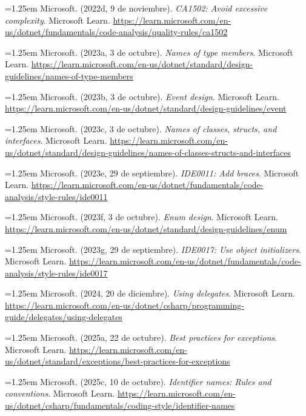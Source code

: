 \smallskip
\noindent\hangindent=1.25em Microsoft. (2022d, 9 de noviembre). \textit{CA1502: Avoid excessive complexity}. Microsoft Learn. \url{https://learn.microsoft.com/en-us/dotnet/fundamentals/code-analysis/quality-rules/ca1502}

\smallskip
\noindent\hangindent=1.25em Microsoft. (2023a, 3 de octubre). \textit{Names of type members}. Microsoft Learn. \url{https://learn.microsoft.com/en-us/dotnet/standard/design-guidelines/names-of-type-members}

\smallskip
\noindent\hangindent=1.25em Microsoft. (2023b, 3 de octubre). \textit{Event design}. Microsoft Learn. \url{https://learn.microsoft.com/en-us/dotnet/standard/design-guidelines/event}

\smallskip
\noindent\hangindent=1.25em Microsoft. (2023c, 3 de octubre). \textit{Names of classes, structs, and interfaces}. Microsoft Learn. \url{https://learn.microsoft.com/en-us/dotnet/standard/design-guidelines/names-of-classes-structs-and-interfaces}

\smallskip
\noindent\hangindent=1.25em Microsoft. (2023e, 29 de septiembre). \textit{IDE0011: Add braces}. Microsoft Learn. \url{https://learn.microsoft.com/en-us/dotnet/fundamentals/code-analysis/style-rules/ide0011}

\smallskip
\noindent\hangindent=1.25em Microsoft. (2023f, 3 de octubre). \textit{Enum design}. Microsoft Learn. \url{https://learn.microsoft.com/en-us/dotnet/standard/design-guidelines/enum}

\smallskip
\noindent\hangindent=1.25em Microsoft. (2023g, 29 de septiembre). \textit{IDE0017: Use object initializers}. Microsoft Learn. \url{https://learn.microsoft.com/en-us/dotnet/fundamentals/code-analysis/style-rules/ide0017}

\smallskip
\noindent\hangindent=1.25em Microsoft. (2024, 20 de diciembre). \textit{Using delegates}. Microsoft Learn. \url{https://learn.microsoft.com/en-us/dotnet/csharp/programming-guide/delegates/using-delegates}

\smallskip
\noindent\hangindent=1.25em Microsoft. (2025a, 22 de octubre). \textit{Best practices for exceptions}. Microsoft Learn. \url{https://learn.microsoft.com/en-us/dotnet/standard/exceptions/best-practices-for-exceptions}

\smallskip
\noindent\hangindent=1.25em Microsoft. (2025c, 10 de octubre). \textit{Identifier names: Rules and conventions}. Microsoft Learn. \url{https://learn.microsoft.com/en-us/dotnet/csharp/fundamentals/coding-style/identifier-names}

